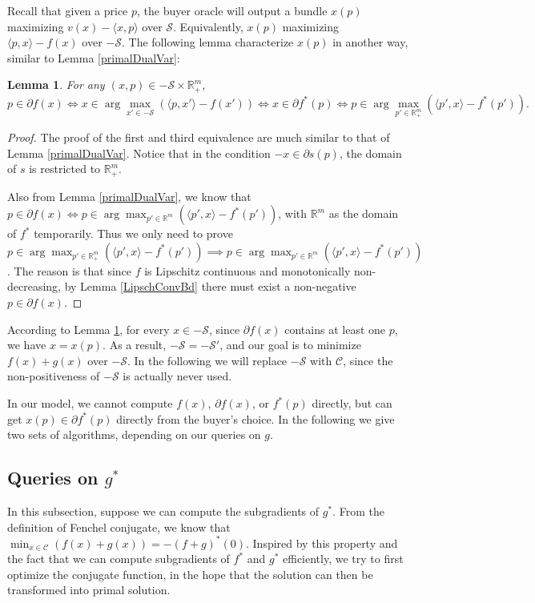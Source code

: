 \documentclass{article}
\newtheorem{lemma}{Lemma}
\begin{document}
Recall that given a price $p$, the buyer oracle will output a bundle $x(p)$ maximizing $v(x)-\langle x,p\rangle$ over $\mathcal{S}$. Equivalently, $x(p)$ maximizing $\langle p,x\rangle-f(x)$ over $-\mathcal{S}$. The following lemma characterize $x(p)$ in another way, similar to Lemma \ref{primalDualVar}:

\begin{lemma}\label{mainLemma}
    For any $(x,p)\in-\mathcal{S}\times \mathbb{R}_+^m$,
    \begin{equation}
        p\in\partial f(x)\iff x\in\arg\max_{x'\in-\mathcal{S}}(\langle p,x'\rangle-f(x'))\iff x\in\partial f^*(p)\iff p\in\arg\max_{p'\in \mathbb{R}_+^m}(\langle p',x\rangle-f^*(p')).
    \end{equation}
\end{lemma}
\begin{proof}
    The proof of the first and third equivalence are much similar to that of Lemma \ref{primalDualVar}. Notice that in the condition $-x\in\partial s(p)$, the domain of $s$ is restricted to $\mathbb{R}_+^m$.

    Also from Lemma \ref{primalDualVar}, we know that $p\in\partial f(x)\iff p\in\arg\max_{p'\in \mathbb{R}^m}(\langle p',x\rangle-f^*(p'))$, with $\mathbb{R}^m$ as the domain of $f^*$ temporarily. Thus we only need to prove $p\in\arg\max_{p'\in \mathbb{R}_+^m}(\langle p',x\rangle-f^*(p'))\implies p\in\arg\max_{p'\in \mathbb{R}^m}(\langle p',x\rangle-f^*(p'))$. The reason is that since $f$ is Lipschitz continuous and monotonically non-decreasing, by Lemma \ref{LipschConvBd} there must exist a non-negative $p\in\partial f(x)$.
\end{proof}

According to Lemma \ref{mainLemma}, for every $x\in-\mathcal{S}$, since $\partial f(x)$ contains at least one $p$, we have $x=x(p)$. As a result, $-\mathcal{S}=-\mathcal{S}'$, and our goal is to minimize $f(x)+g(x)$ over $-\mathcal{S}$. In the following we will replace $-\mathcal{S}$ with $\mathcal{C}$, since the non-positiveness of $-\mathcal{S}$ is actually never used.

In our model, we cannot compute $f(x)$, $\partial f(x)$, or $f^*(p)$ directly, but can get $x(p)\in\partial f^*(p)$ directly from the buyer's choice. In the following we give two sets of algorithms, depending on our queries on $g$.

\subsection{Queries on $g^*$}
In this subsection, suppose we can compute the subgradients of $g^*$. From the definition of Fenchel conjugate, we know that $\min_{x\in \mathcal{C}}(f(x)+g(x))=-(f+g)^*(0)$. Inspired by this property and the fact that we can compute subgradients of $f^*$ and $g^*$ efficiently, we try to first optimize the conjugate function, in the hope that the solution can then be transformed into primal solution.
\end{document}
